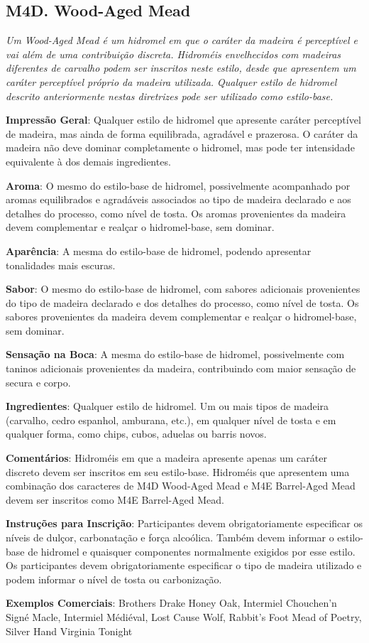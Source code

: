 \subsection*{M4D. Wood-Aged Mead}

\textit{Um Wood-Aged Mead é um hidromel em que o caráter da madeira é perceptível e vai além de uma contribuição discreta. Hidroméis envelhecidos com madeiras diferentes de carvalho podem ser inscritos neste estilo, desde que apresentem um caráter perceptível próprio da madeira utilizada. Qualquer estilo de hidromel descrito anteriormente nestas diretrizes pode ser utilizado como estilo-base.}

\textbf{Impressão Geral}: Qualquer estilo de hidromel que apresente caráter perceptível de madeira, mas ainda de forma equilibrada, agradável e prazerosa. O caráter da madeira não deve dominar completamente o hidromel, mas pode ter intensidade equivalente à dos demais ingredientes.

\textbf{Aroma}: O mesmo do estilo-base de hidromel, possivelmente acompanhado por aromas equilibrados e agradáveis associados ao tipo de madeira declarado e aos detalhes do processo, como nível de tosta. Os aromas provenientes da madeira devem complementar e realçar o hidromel-base, sem dominar.

\textbf{Aparência}: A mesma do estilo-base de hidromel, podendo apresentar tonalidades mais escuras.

\textbf{Sabor}: O mesmo do estilo-base de hidromel, com sabores adicionais provenientes do tipo de madeira declarado e dos detalhes do processo, como nível de tosta. Os sabores provenientes da madeira devem complementar e realçar o hidromel-base, sem dominar.

\textbf{Sensação na Boca}: A mesma do estilo-base de hidromel, possivelmente com taninos adicionais provenientes da madeira, contribuindo com maior sensação de secura e corpo.

\textbf{Ingredientes}: Qualquer estilo de hidromel. Um ou mais tipos de madeira (carvalho, cedro espanhol, amburana, etc.), em qualquer nível de tosta e em qualquer forma, como chips, cubos, aduelas ou barris novos.

\textbf{Comentários}: Hidroméis em que a madeira apresente apenas um caráter discreto devem ser inscritos em seu estilo-base. Hidroméis que apresentem uma combinação dos caracteres de M4D Wood-Aged Mead e M4E Barrel-Aged Mead devem ser inscritos como M4E Barrel-Aged Mead.

\textbf{Instruções para Inscrição}: Participantes devem obrigatoriamente especificar os níveis de dulçor, carbonatação e força alcoólica. Também devem informar o estilo-base de hidromel e quaisquer componentes normalmente exigidos por esse estilo. Os participantes devem obrigatoriamente especificar o tipo de madeira utilizado e podem informar o nível de tosta ou carbonização.

\textbf{Exemplos Comerciais}: Brothers Drake Honey Oak, Intermiel Chouchen'n Signé Macle, Intermiel Médiéval, Lost Cause Wolf, Rabbit's Foot Mead of Poetry, Silver Hand Virginia Tonight